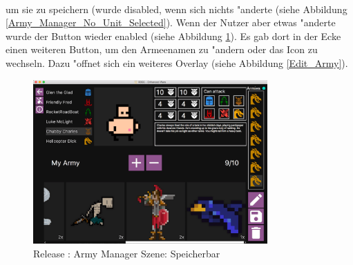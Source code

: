 \documentclass[12pt, titlepage]{scrartcl}
\newcommand{\RN}[1]{%
	\textup{\uppercase\expandafter{\romannumeral#1}}%
}
\begin{document}
                \ \\ um sie zu speichern (wurde disabled, wenn sich nichts "anderte (siehe Abbildung \ref{Army_Manager_No_Unit_Selected}). Wenn der Nutzer aber etwas "anderte wurde der Button wieder enabled (siehe Abbildung \ref{Army_Manager_Ready_To_Save}). Es gab dort in der Ecke einen weiteren Button, um den Armeenamen zu "andern oder das Icon zu wechseln. Dazu "offnet sich ein weiteres Overlay (siehe Abbildung \ref{Edit_Army}). \\
                \begin{figure}[H] 
    				\centering
    				\includegraphics[width=0.8\textwidth]{images/old_state/army_manager/ArmyReadyToSave.png}
    				\caption{Release \RN{2}: Army Manager Szene: Speicherbar}
    				\label{Army_Manager_Ready_To_Save}
			    \end{figure}
\end{document}
